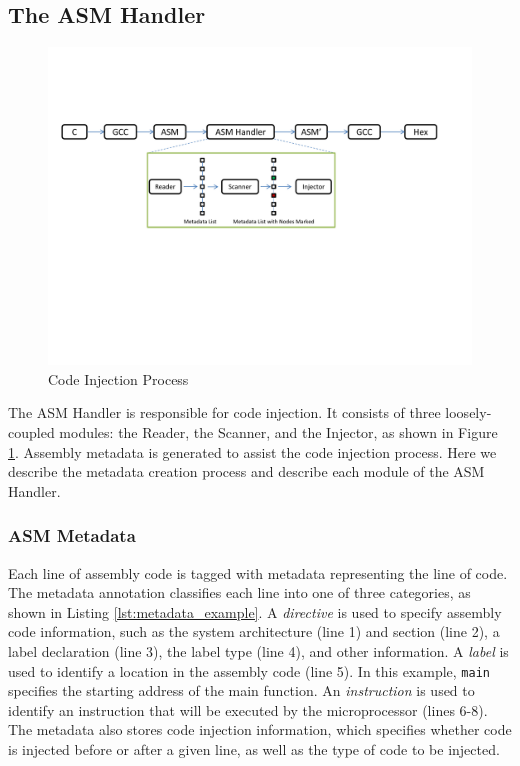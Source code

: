 \subsection{The ASM Handler}
\vspace{-5pt}
\begin{figure}[t]
\centering
\includegraphics[width=1\textwidth]{figures/code_inject_process_v6}
\caption{Code Injection Process}
\label{fig:code_injection_process}
\vspace{-10pt}
\end{figure}

The ASM Handler is responsible for code injection. It consists of three loosely-coupled modules: the Reader, the Scanner, and the Injector, as shown in Figure \ref{fig:code_injection_process}. Assembly metadata is generated to assist the code injection process. Here we describe the metadata creation process and describe each module of the ASM Handler.
\vspace{-15pt}
\subsubsection{ASM Metadata}
\vspace{-5pt}
Each line of assembly code is tagged with metadata representing the line of code. The metadata annotation classifies each line into one of three categories, as shown in Listing \ref{lst:metadata_example}. A \textit{directive} is used to specify assembly code information, such as the system architecture (line 1) and section (line 2), a label declaration (line 3), the label type (line 4), and other information. A \textit{label} is used to identify a location in the assembly code (line 5). In this example, \texttt{main} specifies the starting address of the main function. An \textit{instruction} is used to identify an instruction that will be executed by the microprocessor (lines 6-8). The metadata also stores code injection information, which specifies whether code is injected before or after a given line, as well as the type of code to be injected.

